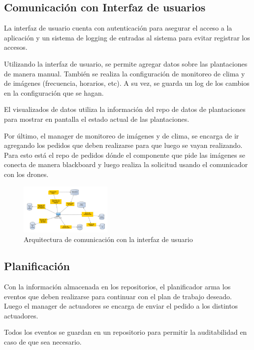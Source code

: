 \subsection{Comunicaci\'on con Interfaz de usuarios}

La interfaz de usuario cuenta con autenticaci\'on para asegurar el acceso a la aplicaci\'on y un sistema de logging de entradas al sistema para evitar registrar los accesos.

Utilizando la interfaz de usuario, se permite agregar datos sobre las plantaciones de manera manual. Tambi\'en se realiza la configuraci\'on de monitoreo de clima y de im\'agenes (frecuencia, horarios, etc). A su vez, se guarda un log de los cambios en la configuraci\'on que se hagan.

El visualizados de datos utiliza la informaci\'on del repo de datos de plantaciones para mostrar en pantalla el estado actual de las plantaciones.

Por \'ultimo, el manager de monitoreo de im\'agenes  y de clima, se encarga de ir agregando los pedidos que deben realizarse para que luego se vayan realizando. Para esto est\'a el repo de pedidos d\'onde el componente que pide las im\'agenes se conecta de manera blackboard y luego realiza la solicitud usando el comunicador con los drones.

\begin{figure}[h!]
  \centering
  \includegraphics[width=0.4\textwidth]{./images/arq_interfazusuario.png}
  \caption{Arquitectura de comunicaci\'on con la interfaz de usuario}
  \label{fig:clases4}
\end{figure}

\subsection{Planificaci\'on}

Con la informaci\'on almacenada en los repositorios, el planificador arma los eventos que deben realizarse para continuar con el plan de trabajo deseado. Luego el manager de actuadores se encarga de enviar el pedido a los distintos actuadores.

Todos los eventos se guardan en un repositorio para permitir la auditabilidad en caso de que sea necesario. 

